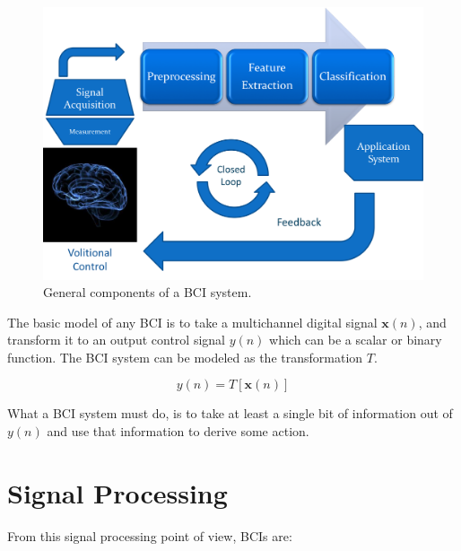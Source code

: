 \begin{figure}[]
\centering
\includegraphics[scale=0.5]{images/bcichart.png}
\caption[BCI Block Diagram]{General components of a BCI system.}
\label{fig:bciblockdiagram}
\end{figure}

The basic model of any BCI is to take a multichannel digital signal $\mathbf{x}(n)$, and transform it to an output control signal $y(n)$ which can be a scalar or binary function.  The BCI system can be modeled as the transformation $T$.

\begin{equation}
y(n) = T\left[\mathbf{x}(n)\right]
\label{eq:bcimodel}
\end{equation}

What a BCI system must do, is to take at least a single bit of information out of $y(n)$ and use that information to derive some action. 

\section{Signal Processing}

From this signal processing point of view, BCIs are:

